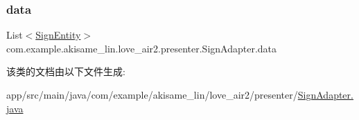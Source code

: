 \subsubsection{\texorpdfstring{data}{data}}
{\footnotesize\ttfamily List$<$\mbox{\hyperlink{classcom_1_1example_1_1akisame__lin_1_1love__air2_1_1presenter_1_1_sign_entity}{Sign\+Entity}}$>$ com.\+example.\+akisame\+\_\+lin.\+love\+\_\+air2.\+presenter.\+Sign\+Adapter.\+data\hspace{0.3cm}{\ttfamily [private]}}



该类的文档由以下文件生成\+:\begin{DoxyCompactItemize}
\item 
app/src/main/java/com/example/akisame\+\_\+lin/love\+\_\+air2/presenter/\mbox{\hyperlink{_sign_adapter_8java}{Sign\+Adapter.\+java}}\end{DoxyCompactItemize}
